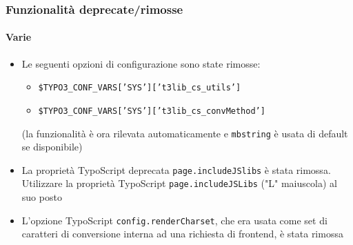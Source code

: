 \begin{frame}[fragile]
	\frametitle{Funzionalità deprecate/rimosse}
	\framesubtitle{Varie}

	\begin{itemize}

		\item Le seguenti opzioni di configurazione sono state rimosse:

			\begin{itemize}
				\item \texttt{\$TYPO3\_CONF\_VARS['SYS']['t3lib\_cs\_utils']}
				\item \texttt{\$TYPO3\_CONF\_VARS['SYS']['t3lib\_cs\_convMethod']}
			\end{itemize}

			\small
				(la funzionalità è ora rilevata automaticamente e \texttt{mbstring} è
				usata di default se disponibile)
			\normalsize

		\item La proprietà TypoScript deprecata \texttt{page.includeJSlibs} è
			stata rimossa. Utilizzare la proprietà TypoScript \texttt{page.includeJSLibs}
			("L" maiuscola) al suo posto

		\item L'opzione TypoScript \texttt{config.renderCharset}, che era usata
			come set di caratteri di conversione interna ad una richiesta di frontend,
			è stata rimossa

	\end{itemize}

\end{frame}

